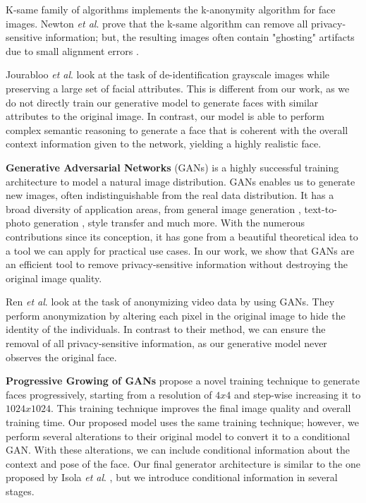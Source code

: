 \documentclass[runningheads]{llncs}
\newcommand{\etal}{\textit{et al}. }
\begin{document}
K-same family of algorithms \cite{Gross2006Model-basedDe-identification,Jourabloo2015AttributeDe-identification,Newton2005} implements the k-anonymity algorithm \cite{Sweeney2002K-anonymity:Privacy} for face images. Newton \etal prove that the k-same algorithm can remove all privacy-sensitive information; but, the resulting images often contain "ghosting" artifacts due to small alignment errors \cite{Gross2006Model-basedDe-identification}.

Jourabloo \etal \cite{Jourabloo2015AttributeDe-identification} look at the task of de-identification grayscale images while preserving a large set of facial attributes. This is different from our work, as we do not directly train our generative model to generate faces with similar attributes to the original image. In contrast, our model is able to perform complex semantic reasoning to generate a face that is coherent with the overall context information given to the network, yielding a highly realistic face.

\textbf{Generative Adversarial Networks} (GANs) \cite{Goodfellow2014} is a highly successful training architecture to model a natural image distribution. GANs enables us to  generate new images, often indistinguishable from the real data distribution. It has a broad diversity of application areas, from general image generation \cite{Brock2018,Karras2017,Karras2018ANetworks,Zhang2018}, text-to-photo generation \cite{Zhang2017}, style transfer \cite{Huang2017ArbitraryNormalization,Ruder2016} and much more. With the numerous contributions since its conception, it has gone from a beautiful theoretical idea to a tool we can apply for practical use cases. 
In our work, we show that GANs are an efficient tool to remove privacy-sensitive information without destroying the original image quality.

 Ren \etal \cite{Ren2018} look at the task of anonymizing video data by using GANs. They perform anonymization by altering each pixel in the original image to hide the identity of the individuals. In contrast to their method, we can ensure the removal of all privacy-sensitive information, as our generative model never observes the original face.

\textbf{Progressive Growing of GANs} \cite{Karras2017} propose a novel training technique to generate faces progressively, starting from a resolution of $4x4$ and step-wise increasing it to $1024x1024$. This training technique improves the final image quality and overall training time. Our proposed model uses the same training technique; however, we perform several alterations to their original model to convert it to a conditional GAN. With these alterations, we can include conditional information about the context and pose of the face.
Our final generator architecture is similar to the one proposed by Isola \etal \cite{Isola2017}, but we introduce conditional information in several stages. 
\end{document}

